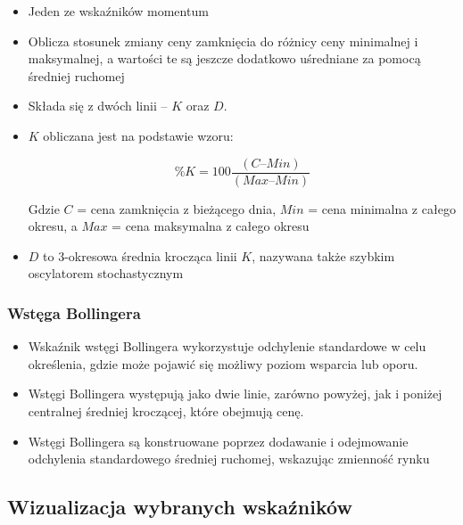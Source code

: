\documentclass[12pt, a4paper]{article}\usepackage[]{graphicx}\usepackage[]{color}
\begin{document}
\begin{itemize}

\item Jeden ze wskaźników momentum

\item Oblicza stosunek zmiany ceny zamknięcia do różnicy ceny minimalnej i maksymalnej, a wartości te są jeszcze dodatkowo uśredniane za pomocą średniej ruchomej

\item Składa się z dwóch linii – $K$ oraz $D$. 

\item $K$ obliczana jest na podstawie wzoru:

\[
 \%K = 100\dfrac{(C – Min)}{(Max – Min)} 
\]

Gdzie $C$ = cena zamknięcia z bieżącego dnia, $Min$ = cena minimalna z całego okresu, a $Max$ = cena maksymalna z całego okresu

\item $D$ to 3-okresowa średnia krocząca linii $K$, nazywana także szybkim oscylatorem stochastycznym

\end{itemize}


\subsubsection{Wstęga Bollingera}


\begin{itemize}

\item Wskaźnik wstęgi Bollingera wykorzystuje odchylenie standardowe w celu określenia, gdzie może pojawić się możliwy poziom wsparcia lub oporu.

\item Wstęgi Bollingera występują jako dwie linie, zarówno powyżej, jak i poniżej centralnej średniej kroczącej, które obejmują cenę.

\item Wstęgi Bollingera są konstruowane poprzez dodawanie i odejmowanie odchylenia standardowego średniej ruchomej, wskazując zmienność rynku

\end{itemize}



\subsection{Wizualizacja wybranych wskaźników}
\end{document}
